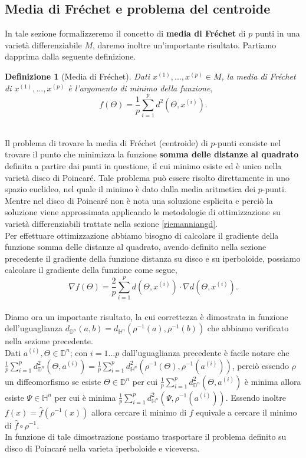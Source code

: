 \documentclass[a4paper, 12pt]{article}
\newtheorem{definition}{Definizione}
\begin{document}
\subsection{Media di Fréchet e problema del centroide}
In tale sezione formalizzeremo il concetto di \textbf{media di Fréchet} di $p$ punti in una varietà differenziabile $M$, daremo inoltre un'importante risultato. Partiamo dapprima dalla seguente definizione.
\begin{definition}[Media di Fréchet]
Dati $x^{(1)}, ..., x^{(p)} \in M$, la media di Fréchet di $x^{(1)}, ..., x^{(p)}$ è l'argomento di minimo della funzione,\\
\[f(\Theta) = \frac{1}{p}\sum_{i=1}^p d^2(\Theta, x^{(i)}).\]\\
\end{definition}
Il problema di trovare la media di Fréchet (centroide) di $p$-punti consiste nel trovare il punto che minimizza la funzione \textbf{somma delle distanze al quadrato} definita a partire dai punti in questione, il cui minimo esiste ed è unico nella varietà disco di Poincaré. Tale problema può essere risolto direttamente in uno spazio euclideo, nel quale il minimo è dato dalla media aritmetica dei $p$-punti. Mentre nel disco di Poincaré non è nota una soluzione esplicita e perciò la soluzione viene approssimata applicando le metodologie di ottimizzazione su varietà differenziabili trattate nella sezione \ref{riemanniangd}.\\
Per effettuare ottimizzazione abbiamo bisogno di calcolare il gradiente della funzione somma delle distanze al quadrato, avendo definito nella sezione precedente il gradiente della funzione distanza su disco e su iperboloide, possiamo calcolare il gradiente della funzione come segue,\\
\[\nabla f(\Theta) = \frac{2}{p} \sum_{i=1}^p d(\Theta, x^{(i)}) \cdot \nabla d(\Theta, x^{(i)}).\]\\
Diamo ora un importante risultato, la cui correttezza è dimostrata in funzione dell'uguaglianza $d_{\mathbb{D}^n}(a, b) = d_{\mathbb{H}^n}(\rho^{-1}(a), \rho^{-1}(b))$ che abbiamo verificato nella sezione precedente.\\
Dati $a^{(i)}, \Theta \in \mathbb{D}^n$; con $i = 1...p$ dall'uguaglianza precedente è facile notare che $\frac{1}{p}\sum_{i=1}^p d_{\mathbb{D}^n}^2(\Theta, a^{(i)}) = \frac{1}{p}\sum_{i=1}^p d_{\mathbb{H}^n}^2(\rho^{-1}(\Theta), \rho^{-1}(a^{(i)}))$, perciò essendo $\rho$ un diffeomorfismo se esiste $\Theta \in \mathbb{D}^n$ per cui $\frac{1}{p}\sum_{i=1}^p d_{\mathbb{D}^n}^2(\Theta, a^{(i)})$ è minima allora esiste $\Psi \in \mathbb{H}^n$ per cui è minima $\frac{1}{p}\sum_{i=1}^p d_{\mathbb{H}^n}^2(\Psi, \rho^{-1}(a^{(i)}))$. Essendo inoltre $f(x) = \hat{f}(\rho^{-1}(x))$ allora cercare il minimo di $f$ equivale a cercare il minimo di $\hat{f} \circ \rho^{-1}$.\\
In funzione di tale dimostrazione possiamo trasportare il problema definito su disco di Poincaré nella varieta iperboloide e viceversa.
\end{document}
